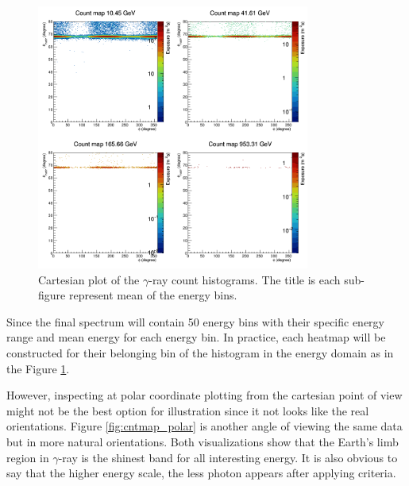 \begin{figure}[h!]
    \centering
    \includegraphics[width=0.8\textwidth]{content/result_and_discussion/figures/cartesian_cntmaps.png}
    \caption{
        Cartesian plot of the $\gamma$-ray count histograms.
        The title is each sub-figure represent
        mean of the energy bins.
    }
    \label{fig:cntmap_cartesian}
\end{figure}

Since the final spectrum will contain 50 energy bins
with their specific energy range and mean energy
for each energy bin.
In practice, each heatmap will be constructed
for their belonging bin of the histogram in the energy domain
as in the Figure \ref{fig:cntmap_cartesian}.


However, inspecting at polar coordinate plotting
from the cartesian point of view might not be the best option for 
illustration since it not looks like the real orientations.
Figure \ref{fig:cntmap_polar} is another
angle of viewing the same data but in more natural orientations.
Both visualizations show that the Earth's limb region in $\gamma$-ray 
is the shinest band for all interesting energy.
It is also obvious to say that the higher energy scale,
the less photon appears after applying criteria.


